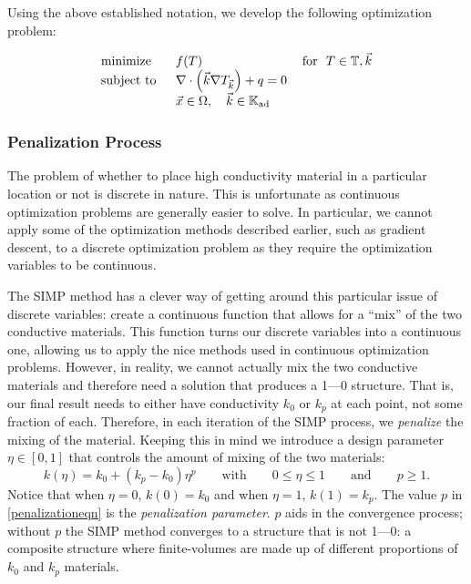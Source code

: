 Using the above established notation, we develop the following optimization problem:

{\color{baystate}
	\begin{equation}
		\begin{tabular}{lll}
			\text{minimize }   & $f(T)$ & \text{for } $T\in\mathbb{T},\vec{k}$      \\
			\text{subject to } & $\nabla\cdot\left(\vec{k}\nabla T_{\vec{k}}\right)+q=0$ & \\
			& $\vec{x}\in\Omega,\quad\vec{k}\in\mathbb{K}_{\text{ad}}$&      
		\end{tabular}\label{SIMP-Optimization-Problem}
	\end{equation}
}

\subsubsection*{Penalization Process}
The problem of whether to place high conductivity material in a particular location or not is discrete in nature. This is unfortunate as continuous optimization problems are generally easier to solve. In particular, we cannot apply some of the optimization methods described earlier, such as gradient descent, to a discrete optimization problem as they require the optimization variables to be continuous.

The SIMP method has a clever way of getting around this particular issue of discrete variables: create a continuous function that allows for a ``mix'' of the two conductive materials. This function turns our discrete variables into a continuous one, allowing us to apply the nice methods used in continuous optimization problems. However, in reality, we cannot actually mix the two conductive materials and therefore need a solution that produces a 1---0 structure. That is, our final result needs to either have conductivity $k_0$ or $k_p$ at each point, not some fraction of each. Therefore, in each iteration of the SIMP process, we \textit{penalize} the mixing of the material. Keeping this in mind we introduce a design parameter $\eta\in\left[0,1\right]$ that controls the amount of mixing of the two materials:
\begin{equation}
	k\left(\eta\right)=k_0+\left(k_p-k_0\right)\eta^p\qquad\text{with}\qquad 0\leq\eta\leq 1\qquad\text{and}\qquad p\geq1.\label{penalizationeqn}
\end{equation}
Notice that when $\eta=0$, $k\left(0\right)=k_0$ and when $\eta=1$, $k\left(1\right)=k_p$. The value $p$ in \eqref{penalizationeqn} is the \textit{penalization parameter}. $p$ aids in the convergence process; without $p$ the SIMP method converges to a structure that is not 1---0: a composite structure where finite-volumes are made up of different proportions of $k_0$ and $k_p$ materials.
